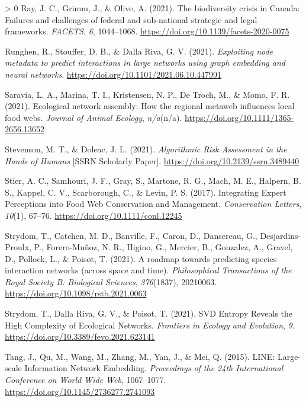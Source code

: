 \documentclass[10pt,oneside]{article}
\newlength{\cslhangindent}
\newenvironment{CSLReferences}[3] %
 {%
  \setlength{\parindent}{0pt}
  \ifodd #1 \everypar{\setlength{\hangindent}{\cslhangindent}}\ignorespaces\fi
  \ifnum #2 > 0
  \setlength{\parskip}{#2\baselineskip}
  \fi
 }%
 {}
\begin{document}
\begin{CSLReferences}{1}{0}
\leavevmode\hypertarget{ref-Ray2021BioCri}{}%
Ray, J. C., Grimm, J., \& Olive, A. (2021). The biodiversity crisis in
Canada: Failures and challenges of federal and sub-national strategic
and legal frameworks. \emph{FACETS}, \emph{6}, 1044--1068.
\url{https://doi.org/10.1139/facets-2020-0075}

\leavevmode\hypertarget{ref-Runghen2021ExpNod}{}%
Runghen, R., Stouffer, D. B., \& Dalla Riva, G. V. (2021).
\emph{Exploiting node metadata to predict interactions in large networks
using graph embedding and neural networks}.
\url{https://doi.org/10.1101/2021.06.10.447991}

\leavevmode\hypertarget{ref-Saravia2021EcoNet}{}%
Saravia, L. A., Marina, T. I., Kristensen, N. P., De Troch, M., \& Momo,
F. R. (2021). Ecological network assembly: How the regional metaweb
influences local food webs. \emph{Journal of Animal Ecology},
\emph{n/a}(n/a). \url{https://doi.org/10.1111/1365-2656.13652}

\leavevmode\hypertarget{ref-Stevenson2021AlgRis}{}%
Stevenson, M. T., \& Doleac, J. L. (2021). \emph{Algorithmic Risk
Assessment in the Hands of Humans} {[}SSRN Scholarly Paper{]}.
\url{https://doi.org/10.2139/ssrn.3489440}

\leavevmode\hypertarget{ref-Stier2017IntExp}{}%
Stier, A. C., Samhouri, J. F., Gray, S., Martone, R. G., Mach, M. E.,
Halpern, B. S., Kappel, C. V., Scarborough, C., \& Levin, P. S. (2017).
Integrating Expert Perceptions into Food Web Conservation and
Management. \emph{Conservation Letters}, \emph{10}(1), 67--76.
\url{https://doi.org/10.1111/conl.12245}

\leavevmode\hypertarget{ref-Strydom2021RoaPre}{}%
Strydom, T., Catchen, M. D., Banville, F., Caron, D., Dansereau, G.,
Desjardins-Proulx, P., Forero-Muñoz, N. R., Higino, G., Mercier, B.,
Gonzalez, A., Gravel, D., Pollock, L., \& Poisot, T. (2021). A roadmap
towards predicting species interaction networks (across space and time).
\emph{Philosophical Transactions of the Royal Society B: Biological
Sciences}, \emph{376}(1837), 20210063.
\url{https://doi.org/10.1098/rstb.2021.0063}

\leavevmode\hypertarget{ref-Strydom2021SvdEnt}{}%
Strydom, T., Dalla Riva, G. V., \& Poisot, T. (2021). SVD Entropy
Reveals the High Complexity of Ecological Networks. \emph{Frontiers in
Ecology and Evolution}, \emph{9}.
\url{https://doi.org/10.3389/fevo.2021.623141}

\leavevmode\hypertarget{ref-Tang2015LinLar}{}%
Tang, J., Qu, M., Wang, M., Zhang, M., Yan, J., \& Mei, Q. (2015). LINE:
Large-scale Information Network Embedding. \emph{Proceedings of the 24th
International Conference on World Wide Web}, 1067--1077.
\url{https://doi.org/10.1145/2736277.2741093}


\end{CSLReferences}
\end{document}
